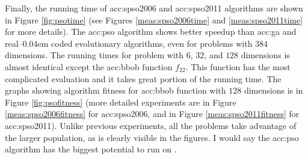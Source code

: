 Finally, the running time of \acrshort{acc:spso2006} and \acrshort{acc:spso2011} algorithms are shown in Figure \ref{fig:psotime} (see Figures \ref{meas:spso2006time} and \ref{meas:spso2011time} for more details). The \acrshort{acc:pso} algorithm shows better speedup than \acrshort{acc:ga} and real--\kern0.04em coded evolutionary algorithms, even for problems with $384$ dimensions. The running times for problem with $6$, $32$, and $128$ dimensions is almost identical except the \acrshort{acc:bbob} function $f_{22}$. This function has the most complicated evaluation and it takes great portion of the running time. The graphs showing algorithm fitness for \acrshort{acc:bbob} function with $128$ dimensions is in Figure \ref{fig:psofitness} (more detailed experiments are in Figure \ref{meas:spso2006fitness} for \acrshort{acc:spso2006}, and in Figure \ref{meas:spso2011fitness} for \acrshort{acc:spso2011}). Unlike previous experiments, all the problems take advantage of the larger population, as is clearly visible in the figures. I would say the \acrshort{acc:pso} algorithm has the biggest potential to run on \gpuns.

